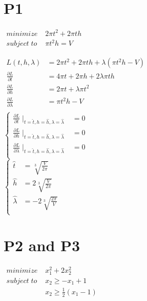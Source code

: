 \documentclass{article}
\newcommand{\p}[2]{\frac{\partial #1}{\partial #2}}
\newcommand{\B}[1]{\left\{\begin{aligned}#1\end{aligned}\right.}
\begin{document}
\section{P1}

\begin{center}
  $
  \begin{aligned}
    minimize \;      & 2\pi t^2 + 2\pi th \\
    subject \; to \; & \pi t^2h = V
  \end{aligned}
  $ \\
\end{center}

$
\begin{aligned}
  L(t,h,\lambda) & =  2\pi t^2 + 2\pi th + \lambda(\pi t^2h - V) \\
  \p{L}{t}       & =  4\pi t   + 2\pi h + 2 \lambda \pi t h      \\
  \p{L}{h}       & =             2 \pi t + \lambda \pi t^2       \\
  \p{L}{\lambda} & =                       \pi t^2h - V          \\
\end{aligned}
$ \\

$
\B{
  \p{L}{t} \mid _ {t=\hat{t},h=\hat{h},\lambda=\hat{\lambda}} &= 0 \\
  \p{L}{h} \mid _ {t=\hat{t},h=\hat{h},\lambda=\hat{\lambda}} &= 0 \\
  \p{L}{\lambda} \mid _ {t=\hat{t},h=\hat{h},\lambda=\hat{\lambda}} &= 0 \\
}
$ \\

$
\B{
  \hat{t}       &= \sqrt[3]{\frac{V}{2\pi}} \\
  \hat{h}       &= 2 \sqrt[3]{\frac{V}{2\pi}} \\
  \hat{\lambda} &= -2 \sqrt[3]{\frac{2\pi}{V}} \\
}
$

\section{P2 and P3}

\begin{center}
  $
  \begin{aligned}
    minimize \;      & x_1^2 + 2x_2^2 \\
    subject \; to \; & x_2 \ge -x_1+1 \\
                     & x_2 \ge \frac{1}{2} (x_1-1)
  \end{aligned}
  $
\end{center}
\end{document}
